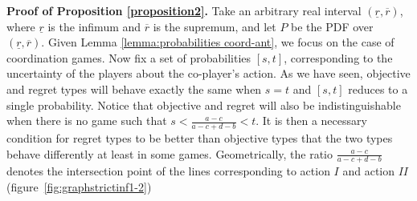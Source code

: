 \documentclass[fleqn,reqno,12pt]{article}
\theoremstyle{Satz}
\theoremstyle{Bsp}
\begin{document}
\noindent \textbf{Proof of Proposition \ref{proposition2}.} Take an arbitrary real interval $(\underline{r},\overline{r})$, where
$\underline{r}$ is the infimum and $\overline{r}$ is the supremum,
and let $P$ be the PDF over $(\underline{r},\overline{r})$. Given
Lemma \ref{lemma:probabilities coord-ant}, we focus on the case of coordination games. Now fix a set
of probabilities $[s,t]$, corresponding to the uncertainty of the
players about the co-player's action. As we have seen, objective and
regret types will behave exactly the same when $s=t$ and $[s,t]$
reduces to a single probability. Notice that objective and regret
will also be indistinguishable when there is no game such that $s<\frac{a-c}{a-c+d-b}<t$.
It is then a necessary condition for regret types to be better than
objective types that the two types behave differently at least in
some games. Geometrically, the ratio $\frac{a-c}{a-c+d-b}$ denotes
the intersection point of the lines corresponding to action $I$ and
action $II$ (figure~\ref{fig:graphstrictinf1-2})
\end{document}

